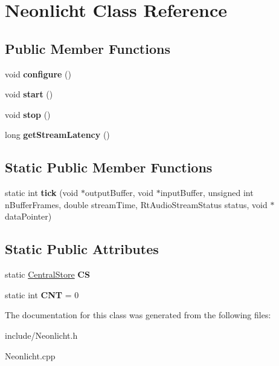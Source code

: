 \hypertarget{classNeonlicht}{\section{Neonlicht Class Reference}
\label{classNeonlicht}
}
\subsection*{Public Member Functions}
\begin{DoxyCompactItemize}
\item 
\hypertarget{classNeonlicht_a32ec4c221148d01bbafd1637ced9b130}{void {\bfseries configure} ()}\label{classNeonlicht_a32ec4c221148d01bbafd1637ced9b130}

\item 
\hypertarget{classNeonlicht_aae54e46be4d251ce4e062cd777994a69}{void {\bfseries start} ()}\label{classNeonlicht_aae54e46be4d251ce4e062cd777994a69}

\item 
\hypertarget{classNeonlicht_a9d1f643b1a2394f9cd181149f7558c72}{void {\bfseries stop} ()}\label{classNeonlicht_a9d1f643b1a2394f9cd181149f7558c72}

\item 
\hypertarget{classNeonlicht_a4354cc2fa6d7bd22e89d1314e375f54f}{long {\bfseries get\-Stream\-Latency} ()}\label{classNeonlicht_a4354cc2fa6d7bd22e89d1314e375f54f}

\end{DoxyCompactItemize}
\subsection*{Static Public Member Functions}
\begin{DoxyCompactItemize}
\item 
\hypertarget{classNeonlicht_a57c3e8d4154418c9efc4b48d45b732d6}{static int {\bfseries tick} (void $\ast$output\-Buffer, void $\ast$input\-Buffer, unsigned int n\-Buffer\-Frames, double stream\-Time, Rt\-Audio\-Stream\-Status status, void $\ast$data\-Pointer)}\label{classNeonlicht_a57c3e8d4154418c9efc4b48d45b732d6}

\end{DoxyCompactItemize}
\subsection*{Static Public Attributes}
\begin{DoxyCompactItemize}
\item 
\hypertarget{classNeonlicht_a1ac3a31190125df3763a9f3d2f085d5e}{static \hyperlink{classCentralStore}{Central\-Store} {\bfseries C\-S}}\label{classNeonlicht_a1ac3a31190125df3763a9f3d2f085d5e}

\item 
\hypertarget{classNeonlicht_ac86fbdabd4683feaac58b4aefbdf6695}{static int {\bfseries C\-N\-T} = 0}\label{classNeonlicht_ac86fbdabd4683feaac58b4aefbdf6695}

\end{DoxyCompactItemize}


The documentation for this class was generated from the following files\-:\begin{DoxyCompactItemize}
\item 
include/Neonlicht.\-h\item 
Neonlicht.\-cpp\end{DoxyCompactItemize}
